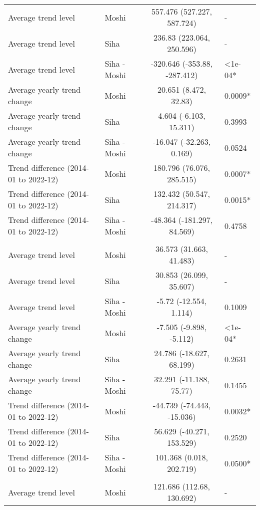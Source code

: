 \begin{longtable}{l|lcl}
\midrule\addlinespace[2.5pt]
\multicolumn{4}{l}{Diabetes Mellitus} \\[2.5pt] 
\midrule\addlinespace[2.5pt]
Average trend level & Moshi & 557.476 (527.227, 587.724) & - \\ 
Average trend level & Siha & 236.83 (223.064, 250.596) & - \\ 
Average trend level & Siha - Moshi & -320.646 (-353.88, -287.412) & <1e-04* \\ 
Average yearly trend change & Moshi & 20.651 (8.472, 32.83) & 0.0009* \\ 
Average yearly trend change & Siha & 4.604 (-6.103, 15.311) & 0.3993 \\ 
Average yearly trend change & Siha - Moshi & -16.047 (-32.263, 0.169) & 0.0524 \\ 
Trend difference (2014-01 to 2022-12) & Moshi & 180.796 (76.076, 285.515) & 0.0007* \\ 
Trend difference (2014-01 to 2022-12) & Siha & 132.432 (50.547, 214.317) & 0.0015* \\ 
Trend difference (2014-01 to 2022-12) & Siha - Moshi & -48.364 (-181.297, 84.569) & 0.4758 \\ 
\midrule\addlinespace[2.5pt]
\multicolumn{4}{l}{Dysentery} \\[2.5pt] 
\midrule\addlinespace[2.5pt]
Average trend level & Moshi & 36.573 (31.663, 41.483) & - \\ 
Average trend level & Siha & 30.853 (26.099, 35.607) & - \\ 
Average trend level & Siha - Moshi & -5.72 (-12.554, 1.114) & 0.1009 \\ 
Average yearly trend change & Moshi & -7.505 (-9.898, -5.112) & <1e-04* \\ 
Average yearly trend change & Siha & 24.786 (-18.627, 68.199) & 0.2631 \\ 
Average yearly trend change & Siha - Moshi & 32.291 (-11.188, 75.77) & 0.1455 \\ 
Trend difference (2014-01 to 2022-12) & Moshi & -44.739 (-74.443, -15.036) & 0.0032* \\ 
Trend difference (2014-01 to 2022-12) & Siha & 56.629 (-40.271, 153.529) & 0.2520 \\ 
Trend difference (2014-01 to 2022-12) & Siha - Moshi & 101.368 (0.018, 202.719) & 0.0500* \\ 
\midrule\addlinespace[2.5pt]
\multicolumn{4}{l}{Epilepsy} \\[2.5pt] 
\midrule\addlinespace[2.5pt]
Average trend level & Moshi & 121.686 (112.68, 130.692) & - \\ 

\end{longtable}
